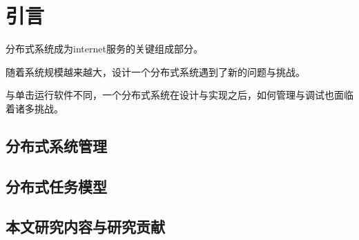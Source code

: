 \chapter{引言}
\label{chap:intro}

分布式系统成为internet服务的关键组成部分。

随着系统规模越来越大，设计一个分布式系统遇到了新的问题与挑战。

与单击运行软件不同，一个分布式系统在设计与实现之后，如何管理与调试也面临
着诸多挑战。



\section{分布式系统管理}

\section{分布式任务模型}

\section{本文研究内容与研究贡献}

